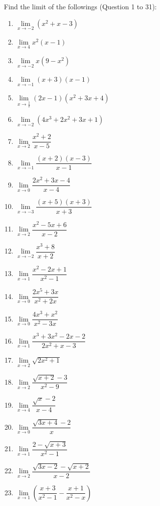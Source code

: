 \documentclass[12pt]{report}
\begin{document}
\setlength{\columnseprule}{1pt}
\setlength{\columnsep}{24pt}
\begin{multicols}{2}
  Find the limit of the followings (Question 1 to 31):

  \begin{enumerate}
    \item $\lim\limits_{x\to-2}\left(x^{2}+x-3\right)$
    \item $\lim\limits_{x\to4}x^{2}(x-1)$
    \item $\lim\limits_{x\to-2}x\left(9-x^{2}\right)$
    \item $\lim\limits_{x\to-1}(x+3)\left(x-1\right)$
    \item $\lim\limits_{x\to{\frac{1}{2}}}\left(2x-1\right)\left(x^{2}+3x+4\right)$
    \item $\lim\limits_{x\to-2}\left(4x^{3}+2x^{2}+3x+1\right)$
    \item $\lim\limits_{x\to2}{\dfrac{x^{2}+2}{x-5}}$
    \item $\lim\limits_{x\to-1}{\dfrac{(x+2)(x-3)}{x-1}}$
    \item $\lim\limits_{x\to0}{\dfrac{2x^{2}+3x-4}{x-4}}$
    \item $\lim\limits_{x\to-3}\dfrac{(x+5)(x+3)}{x+3}$
    \item $\lim\limits_{x\to2}{\dfrac{x^{2}-5x+6}{x-2}}$
    \item $\lim\limits_{x\to-2}{\dfrac{x^{3}+8}{x+2}}$
    \item $\lim\limits_{x\to1}{\dfrac{x^{2}-2x+1}{x^{2}-1}}$
    \item $\lim\limits_{x\to0}{\dfrac{2x^{5}+3x}{x^{2}+2x}}$
    \item $\lim\limits_{x\to0}{\dfrac{4x^{3}+x^{2}}{x^{2}-3x}}$
    \item $\lim\limits_{x\to1}{\dfrac{x^{3}+3x^{2}-2x-2}{2x^{2}+x-3}}$
    \item $\lim\limits_{x\to2}{\sqrt{2x^{2}+1}}$
    \item $\lim\limits_{x\to2}{\dfrac{{\sqrt{x+2}}-3}{x^{2}-9}}$
    \item $\lim\limits_{x\to4}{\dfrac{{\sqrt{x}}-2}{x-4}}$
    \item $\lim\limits_{x\to0}{\dfrac{\sqrt{3x+4}-2}{x}}$
    \item $\lim\limits_{x\to1}{\dfrac{2-{\sqrt{x+3}}}{x^{2}-1}}$
    \item $\lim\limits_{x\to2}{\dfrac{{\sqrt{3x-2}}-{\sqrt{x+2}}}{x-2}}$
    \item $\lim\limits_{x\to1}\left({\dfrac{x+3}{x^{2}-1}}-{\dfrac{x+1}{x^{2}-x}}\right)$

\end{enumerate}
\end{multicols}
\end{document}
